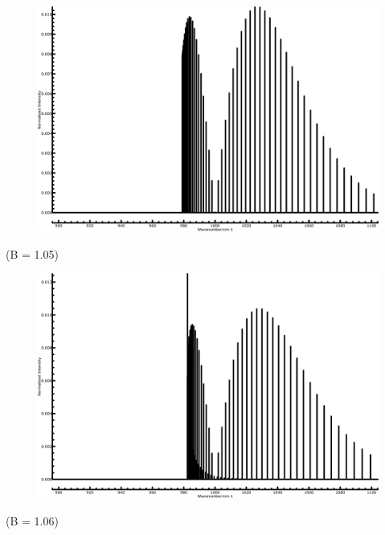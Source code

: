 \begin{center}
	\begin{minipage}{\linewidth}
		\begin{minipage}{0.5\linewidth}
			\begin{figure}[H]
				\centering \includegraphics[width=\linewidth] 						{figures/B105.png}
			\end{figure} 
				\centering(B = 1.05) \\
		\end{minipage}
		\begin{minipage}{0.5\linewidth}
		   \begin{figure}[H]
				\centering \includegraphics[width=\linewidth]	  					{figures/B106.png}
			\end{figure}
				\centering(B = 1.06) \\
		\end{minipage}
	\end{minipage}
\end{center}
